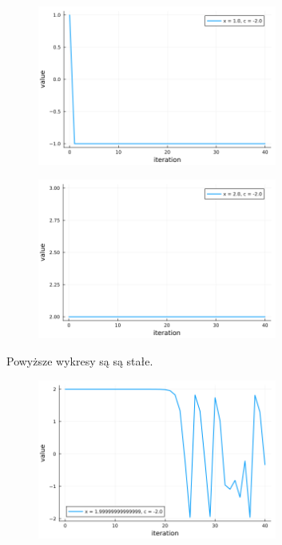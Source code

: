 \documentclass[15pt, a4paper]{article}
\begin{document}
\vspace{0.5cm}

\begin{figure}[h]
    \centering
    \includegraphics[width=0.7\textwidth]{img/6_1_plot.png}
\end{figure}

\begin{figure}[h]
    \centering
    \includegraphics[width=0.7\textwidth]{img/6_2_plot.png}
\end{figure}

\vspace{0.5cm}

\noindent Powyższe wykresy są są stałe.

\vspace{0.5cm}

\begin{figure}[h]
    \centering
    \includegraphics[width=0.7\textwidth]{img/6_3_plot.png}
\end{figure}
\end{document}
